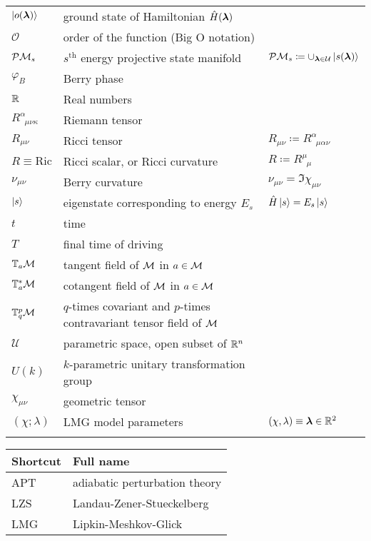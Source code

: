 \begin{tabular} {@{}C{1.9cm}@{}p{8cm}@{}C{3.77cm}}
	  $\ket{o({\bm\lambda})}$& ground state of Hamiltonian $\hat{H}({\bm\lambda})$  &  \\
	  $\mathcal O$& order of the function (Big O notation)  &  \\
	  $\mathcal{P}\mathcal{M}_s$& $s^{\text{th}}$ energy projective state manifold & $\mathcal{P}\mathcal{M}_s\coloneqq\cup_{{\bm\lambda}\in\mathcal U} \ket{s({\bm\lambda})}$ \\
	  $\varphi_B$ & Berry phase & \\
	  $\mathbb{R}$& Real numbers  &  \\
	  $R^\alpha_{\;\;\mu\nu\kappa}$ &Riemann tensor & \\
	  $R_{\mu\nu}$ & Ricci tensor & $R_{\mu\nu}\coloneqq R^\alpha_{\;\;\mu\alpha\nu}$\\
	  $R\equiv \mathrm{Ric}$ & Ricci scalar, or Ricci curvature & $R\coloneqq R^\mu_{\;\;\mu}$\\
	  $\nu_{\mu\nu}$ & Berry curvature & $\nu_{\mu\nu}= \Im\chi_{\mu\nu}$ \\ 
	  $\ket{s}$& eigenstate corresponding to energy $E_s$& $\hat{H}\ket{s}=E_s\ket{s}$ \\
	  $t$& time  &  \\
	  $T$& final time of driving  &  \\
	  $\mathbb T_a \mathcal{M}$& tangent field of $\mathcal{M}$ in $a\in \mathcal{M}$ &  \\
	  $\mathbb T_a^* \mathcal{M}$& cotangent field of $\mathcal{M}$ in $a\in \mathcal{M}$ &  \\
	  $\mathbb{T}^p_q\mathcal{M}$& $q$-times covariant and $p$-times contravariant tensor field of $\mathcal{M}$&  \\
	  $\mathcal U$& parametric space, open subset of $\mathbb{R}^n$  & \\
	  $U(k)$& $k$-parametric unitary transformation group  &  \\
	  $\chi_{\mu\nu}$ & geometric tensor &  \\
	  $(\chi;\lambda)$& LMG model parameters  & $(\chi,\lambda)\equiv {\bm\lambda}\in\mathbb{R}^2$ \\
\bottomrule
{}
\end{tabular}



\begin{tabular} {@{}C{3cm}@{}p{9cm}}
	\toprule
	\textbf{Shortcut}& \textbf{Full name}\\\bottomrule
	
	APT & adiabatic perturbation theory \\
	LZS & Landau-Zener-Stueckelberg\\
	LMG & Lipkin-Meshkov-Glick \\
	\bottomrule
\end{tabular}


